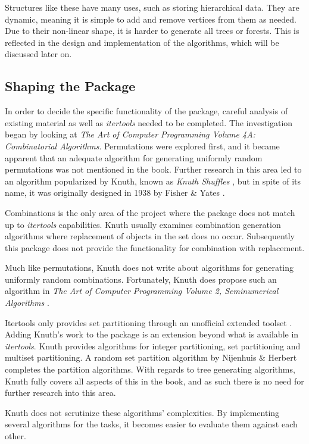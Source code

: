 \documentclass[12pt]{article}
\begin{document}
Structures like these have many uses, such as storing hierarchical data. They are dynamic, meaning it is simple to add and remove vertices from them as needed. Due to their non-linear shape, it is harder to generate all trees or forests. This is reflected in the design and implementation of the algorithms, which will be discussed later on.

\subsection{Shaping the Package}
In order to decide the specific functionality of the package, careful analysis of existing material as well as \textit{itertools} needed to be completed. The investigation began by looking at \textit{The Art of Computer Programming Volume 4A: Combinatorial Algorithms}. Permutations were explored first, and it became apparent that an adequate algorithm for generating uniformly random permutations was not mentioned in the book. Further research in this area led to an algorithm popularized by Knuth, known as \textit{Knuth Shuffles} \cite{knuth_shuffle}, but in spite of its name, it was originally designed in 1938 by Fisher \& Yates \cite{rand_perm}.

Combinations is the only area of the project where the package does not match up to \textit{itertools} capabilities. Knuth usually examines combination generation algorithms where replacement of objects in the set does no occur. Subsequently this package does not provide the functionality for combination with replacement.

Much like permutations, Knuth does not write about algorithms for generating uniformly random combinations. Fortunately, Knuth does propose such an algorithm in \textit{The Art of Computer Programming Volume 2, Seminumerical Algorithms} \cite{rand_comb}.

Itertools only provides set partitioning through an unofficial extended toolset \cite{itertools_extension}. Adding Knuth’s work to the package is an extension beyond what is available in \textit{itertools}. Knuth provides algorithms for integer partitioning, set partitioning and multiset partitioning. A random set partition algorithm by Nijenhuis \& Herbert \cite{rand_set_part} completes the partition algorithms. With regards to tree generating algorithms, Knuth fully covers all aspects of this in the book, and as such there is no need for further research into this area.

Knuth does not scrutinize these algorithms' complexities. By implementing several algorithms for the tasks, it becomes easier to evaluate them against each other. 
\end{document}
